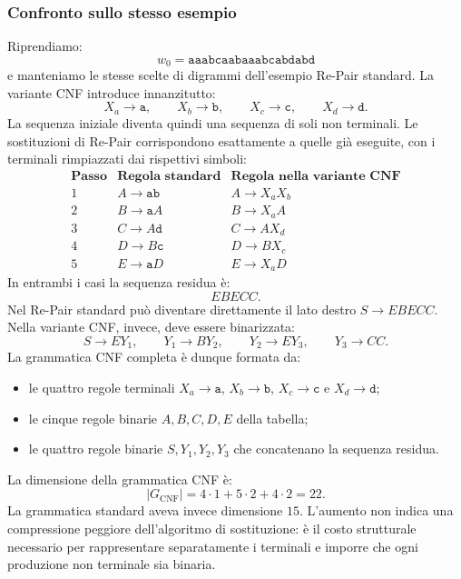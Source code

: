 \documentclass{article}
\theoremstyle{definition}
\numberwithin{equation}{section}
\begin{document}
\subsubsection{Confronto sullo stesso esempio}
Riprendiamo:
\[
    w_0=\texttt{aaabcaabaaabcabdabd}
\]
e manteniamo le stesse scelte di digrammi dell'esempio Re-Pair standard. La
variante CNF introduce innanzitutto:
\[
    X_a\to\texttt{a},
    \qquad
    X_b\to\texttt{b},
    \qquad
    X_c\to\texttt{c},
    \qquad
    X_d\to\texttt{d}.
\]
La sequenza iniziale diventa quindi una sequenza di soli non terminali. Le
sostituzioni di Re-Pair corrispondono esattamente a quelle già eseguite, con i
terminali rimpiazzati dai rispettivi simboli:
\[
    \begin{array}{c|c|l}
        \textbf{Passo}
        & \textbf{Regola standard}
        & \textbf{Regola nella variante CNF} \\ \hline
        1 & A\to\texttt{ab}   & A\to X_aX_b \\
        2 & B\to\texttt{a}A   & B\to X_aA   \\
        3 & C\to A\texttt{d}  & C\to AX_d   \\
        4 & D\to B\texttt{c}  & D\to BX_c   \\
        5 & E\to\texttt{a}D   & E\to X_aD
    \end{array}
\]
In entrambi i casi la sequenza residua è:
\[
    EBECC.
\]
Nel Re-Pair standard può diventare direttamente il lato destro
$S\to EBECC$. Nella variante CNF, invece, deve essere binarizzata:
\[
    S\to EY_1,
    \qquad
    Y_1\to BY_2,
    \qquad
    Y_2\to EY_3,
    \qquad
    Y_3\to CC.
\]
La grammatica CNF completa è dunque formata da:
\begin{itemize}
    \item le quattro regole terminali $X_a\to\texttt{a}$,
          $X_b\to\texttt{b}$, $X_c\to\texttt{c}$ e
          $X_d\to\texttt{d}$;
    \item le cinque regole binarie $A,B,C,D,E$ della tabella;
    \item le quattro regole binarie $S,Y_1,Y_2,Y_3$ che concatenano la
          sequenza residua.
\end{itemize}
La dimensione della grammatica CNF è:
\[
    |G_{\mathrm{CNF}}|
    =
    4\cdot 1+5\cdot 2+4\cdot 2
    =
    22.
\]
La grammatica standard aveva invece dimensione $15$. L'aumento non indica una
compressione peggiore dell'algoritmo di sostituzione: è il costo strutturale
necessario per rappresentare separatamente i terminali e imporre che ogni
produzione non terminale sia binaria.
\end{document}
